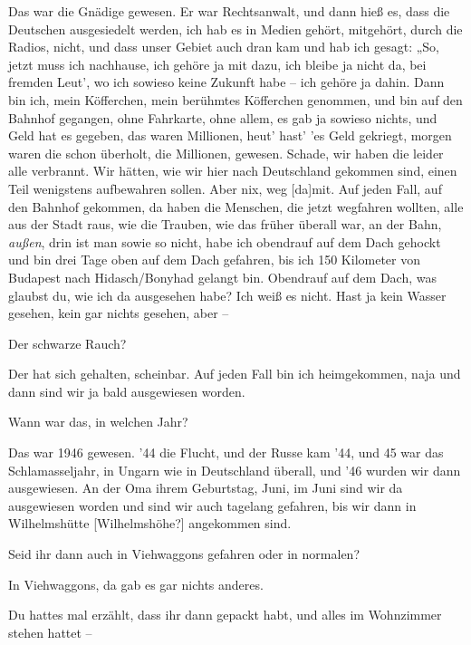 \documentclass[ngerman,]{article}
\providecommand{\tightlist}{%
  \setlength{\itemsep}{0pt}\setlength{\parskip}{0pt}}
\begin{document}
\begin{multicols}{2}
\begin{description}
\tightlist
\item[Käthe]
Das war die Gnädige gewesen. Er war Rechtsanwalt, und dann hieß es, dass
die Deutschen ausgesiedelt werden, ich hab es in Medien gehört,
mitgehört, durch die Radios, nicht, und dass unser Gebiet auch dran kam
und hab ich gesagt: „So, jetzt muss ich nachhause, ich gehöre ja mit
dazu, ich bleibe ja nicht da, bei fremden Leut', wo ich sowieso keine
Zukunft habe – ich gehöre ja dahin. Dann bin ich, mein Köfferchen, mein
berühmtes Köfferchen genommen, und bin auf den Bahnhof gegangen, ohne
Fahrkarte, ohne allem, es gab ja sowieso nichts, und Geld hat es
gegeben, das waren Millionen, heut' hast' 'es Geld gekriegt, morgen
waren die schon überholt, die Millionen, gewesen. Schade, wir haben die
leider alle verbrannt. Wir hätten, wie wir hier nach Deutschland
gekommen sind, einen Teil wenigstens aufbewahren sollen. Aber nix, weg
{[}da{]}mit. Auf jeden Fall, auf den Bahnhof gekommen, da haben die
Menschen, die jetzt wegfahren wollten, alle aus der Stadt raus, wie die
Trauben, wie das früher überall war, an der Bahn, \emph{außen}, drin ist
man sowie so nicht, habe ich obendrauf auf dem Dach gehockt und bin drei
Tage oben auf dem Dach gefahren, bis ich 150 Kilometer von Budapest nach
Hidasch/Bonyhad gelangt bin. Obendrauf auf dem Dach, was glaubst du, wie
ich da ausgesehen habe? Ich weiß es nicht. Hast ja kein Wasser gesehen,
kein gar nichts gesehen, aber –
\item[Ruth]
Der schwarze Rauch?
\item[Käthe]
Der hat sich gehalten, scheinbar. Auf jeden Fall bin ich heimgekommen,
naja und dann sind wir ja bald ausgewiesen worden.
\item[Ruth]
Wann war das, in welchen Jahr?
\item[Käthe]
Das war 1946 gewesen. '44 die Flucht, und der Russe kam '44, und 45 war
das Schlamasseljahr, in Ungarn wie in Deutschland überall, und '46
wurden wir dann ausgewiesen. An der Oma ihrem Geburtstag, Juni, im Juni
sind wir da ausgewiesen worden und sind wir auch tagelang gefahren, bis
wir dann in Wilhelmshütte {[}Wilhelmshöhe?{]} angekommen sind.
\item[Ruth]
Seid ihr dann auch in Viehwaggons gefahren oder in normalen?
\item[Käthe]
In Viehwaggons, da gab es gar nichts anderes.
\item[Ruth]
Du hattes mal erzählt, dass ihr dann gepackt habt, und alles im
Wohnzimmer stehen hattet –
\item[Käthe]

\end{description}
\end{multicols}
\end{document}
